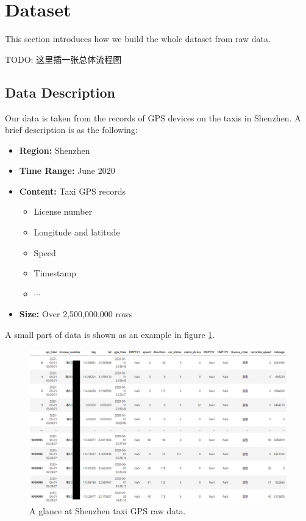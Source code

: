 
\section{Dataset}
This section introduces how we build the whole dataset from raw data.

TODO: 这里插一张总体流程图

\subsection{Data Description}
Our data is taken from the records of GPS devices on the taxis in Shenzhen. A brief description is as the following:
\begin{itemize}
    \item \textbf{Region:} Shenzhen
    \item \textbf{Time Range:} June 2020
    \item \textbf{Content:} Taxi GPS records
    \begin{itemize}
      \item License number
      \item Longitude and latitude
      \item Speed
      \item Timestamp
      \item $\cdots$
    \end{itemize}
  \item \textbf{Size:} Over 2,500,000,000 rows
\end{itemize}

A small part of data is shown as an example in figure \ref{fig: raw_data}.
\begin{figure}[htb]
    \centering
    \includegraphics[width=\textwidth]{images/raw_data.png}
    \caption{A glance at Shenzhen taxi GPS raw data.}
    \label{fig: raw_data}
\end{figure}

